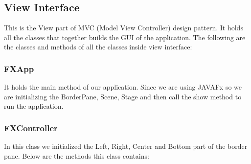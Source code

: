 \documentclass{scrreprt}
\begin{document}
\subsection{View Interface}

This is the View part of MVC (Model View Controller) design pattern. It holds all the classes that together builds the GUI of the application. The following are the classes and methods of all the classes inside view interface:

\subsubsection{FXApp}

It holds the main method of our application. Since we are using JAVAFx so we are initializing the BorderPane, Scene, Stage and then call the show method to run the application.

\subsubsection{FXController}

In this class we initialized the Left, Right, Center and Bottom part of the border pane. Below are the methods this class contains:
\end{document}

